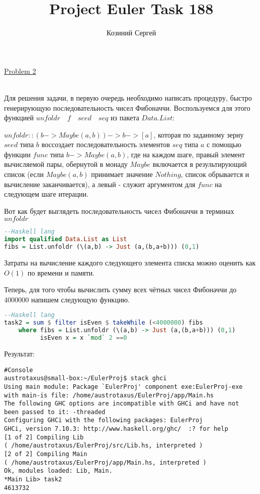 \documentclass[11pt,a4paper]{article}
\title{Project Euler Task 188}
\author{Козиний Сергей}
\begin{document}
    
\maketitle
\href{''https://projecteuler.net/problem=2''}{Problem 2}

\\

Для решения задачи, в первую очередь необходимо написать процедуру, быстро генерирующую последовательность чисел Фибоначчи. Воспользуемся для этого функцией $unfoldr \quad f \quad seed \quad seq$ из пакета $Data.List$:

$unfoldr :: (b -> Maybe (a, b)) -> b -> [a] $,
которая по заданному зерну $seed$ типа $b$ воссоздает последовательность элементов $seq$ типа $a$ с помощью функции $func$ типа  $b -> Maybe (a, b)$, где на каждом шаге, правый элемент вычисляемой пары, обернутой в монаду $Maybe$ включается в результирующий список (если $Maybe(a,b)$ принимает значение $Nothing$, список обрывается и вычисление заканчивается), а левый - служит аргументом для $func$ на следующем шаге итерации. 

Вот как будет выглядеть последовательность чисел Фибоначчи в терминах $unfoldr$

\begin{lstlisting}[language=Haskell]
  --Haskell lang
import qualified Data.List as List
fibs = List.unfoldr (\(a,b) -> Just (a,(b,a+b))) (0,1)  
\end{lstlisting}
Затраты на вычисление каждого следующего элемента списка можно оценить как  $O(1)$ по времени и памяти.

Теперь, для того чтобы вычислить сумму всех чётных чисел Фибоначчи до 4000000 напишем следующую функцию.
\begin{lstlisting}[language=Haskell]
  --Haskell lang
task2 = sum $ filter isEven $ takeWhile (<4000000) fibs 
    where fibs = List.unfoldr (\(a,b) -> Just (a,(b,a+b))) (0,1)
          isEven x = x `mod` 2 ==0
\end{lstlisting}

Результат:

\begin{lstlisting}
#Console
austrotaxus@small-box:~/EulerProj$ stack ghci
Using main module: Package `EulerProj' component exe:EulerProj-exe
with main-is file: /home/austrotaxus/EulerProj/app/Main.hs
The following GHC options are incompatible with GHCi and have not
been passed to it: -threaded
Configuring GHCi with the following packages: EulerProj
GHCi, version 7.10.3: http://www.haskell.org/ghc/  :? for help
[1 of 2] Compiling Lib
( /home/austrotaxus/EulerProj/src/Lib.hs, interpreted )
[2 of 2] Compiling Main
( /home/austrotaxus/EulerProj/app/Main.hs, interpreted )
Ok, modules loaded: Lib, Main. 
*Main Lib> task2
4613732
\end{lstlisting}
\end{document}
